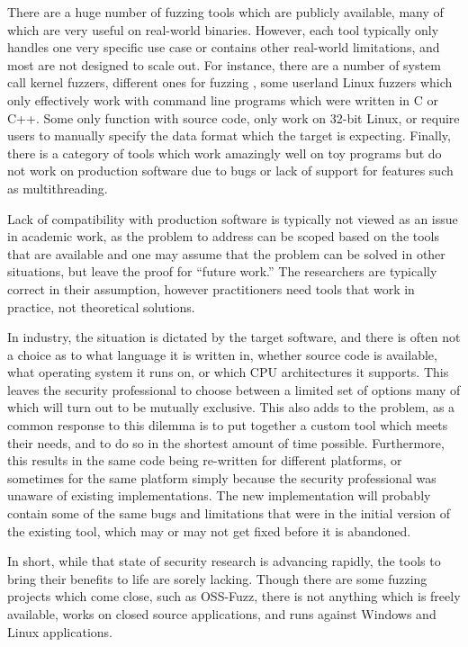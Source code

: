 There are a huge number of fuzzing tools\cite{afl,aflosx,winafl,peach22,syzkaller,ossfuzz,driller,radamsa,ni,zzuf,synfuzz,brundlefuzz,honggfuzz,kafl} which are publicly available, many of
which are very useful on real-world binaries.
However, each tool
typically only handles one very specific use case or contains other real-world limitations, and most are not designed to scale
out.  For instance, there are a number of system call kernel fuzzers\cite{syzkaller,trinity,kafl,osxfuzz}, different ones for
fuzzing \IOCTLs{}\cite{ioctlfuzzer,ioctlbf}, some userland Linux fuzzers which only effectively work with
command line programs which were written in C or C++.  Some only function with
source code, only work on 32-bit Linux\cite{vuzzer}, or require users to manually specify
the data format which the target is
expecting.\cite{peach,boofuzz}  Finally, there is a category of tools which work amazingly well
on toy programs but do not work on production software due to bugs or lack of
support for features such as multithreading.\cite{grimmdriller}

Lack of compatibility with production software is typically not viewed as an issue in academic work, as the problem to address can be
scoped based on the tools that are available and one may assume that the problem can
be solved in other situations, but leave the proof for ``future work.''  The researchers
are typically correct in their assumption, however practitioners need tools
that work in practice, not theoretical solutions.

In industry, the situation is dictated by the target software,
and there is often not a choice as to what language it is
written in, whether source code is available, what operating system it runs
on, or which CPU architectures it supports. This leaves the security
professional to choose between a limited set of options many of which will
turn out to be mutually exclusive. This also adds to the problem, as a common
response to this dilemma is to put together a custom tool which meets their
needs, and to do so in the shortest amount of time possible.  Furthermore,
this results in the same code being re-written for different platforms, or
sometimes for the same platform simply because the security professional was
unaware of existing implementations.  The new implementation will probably
contain some of the same bugs and limitations that were in the initial
version of the existing tool, which may or may not get fixed before it is
abandoned.

In short, while that state of security research is advancing rapidly, the
tools to bring their benefits to life are sorely lacking.  Though there are some
fuzzing projects which come close, such as OSS-Fuzz,\cite{ossfuzz} there
is not anything which is freely available, works on closed source applications,
and runs against Windows and Linux applications.
